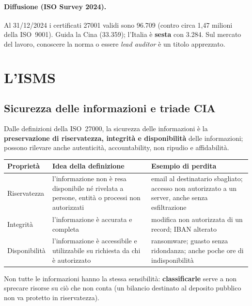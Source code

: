 \paragraph{Diffusione (ISO Survey 2024).} Al 31/12/2024 i certificati 27001 validi sono 96.709 (contro circa
1,47 milioni della ISO~9001). Guida la Cina (33.359); l'Italia è \textbf{sesta} con 3.284. Sul mercato del
lavoro, conoscere la norma o essere \emph{lead auditor} è un titolo apprezzato.

\section{L'ISMS}
\label{sec:iso-isms}

\subsection{Sicurezza delle informazioni e triade CIA}
Dalle definizioni della ISO~27000, la sicurezza delle informazioni è la \textbf{preservazione di
riservatezza, integrità e disponibilità} delle informazioni; possono rilevare anche autenticità,
accountability, non ripudio e affidabilità.
\begin{center}
\small
\begin{tabularx}{\linewidth}{>{\raggedright\arraybackslash}p{2.6cm} X X}
\toprule
\textbf{Proprietà} & \textbf{Idea della definizione} & \textbf{Esempio di perdita}\\
\midrule
Riservatezza & l'informazione non è resa disponibile né rivelata a persone, entità o processi non
  autorizzati & email al destinatario sbagliato; accesso non autorizzato a un server, anche senza
  esfiltrazione\\
Integrità & l'informazione è accurata e completa & modifica non autorizzata di un record; IBAN alterato\\
Disponibilità & l'informazione è accessibile e utilizzabile su richiesta da chi è autorizzato & ransomware;
  guasto senza ridondanza; anche poche ore di indisponibilità\\
\bottomrule
\end{tabularx}
\end{center}
\noindent Non tutte le informazioni hanno la stessa sensibilità: \textbf{classificarle} serve a non sprecare
risorse su ciò che non conta (un bilancio destinato al deposito pubblico non va protetto in riservatezza).

